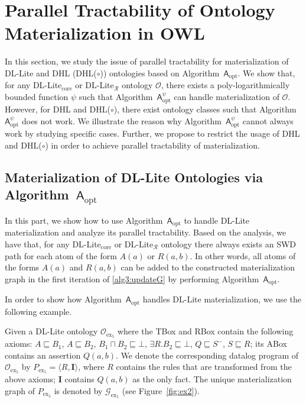 \section{Parallel Tractability of Ontology Materialization in OWL}
\label{sec:ptonto}

In this section, we study the issue of parallel tractability
for materialization of DL-Lite and DHL (DHL($\circ$)) ontologies
based on Algorithm~$\mathsf{A}_{\text{opt}}$. We show that, for any DL-Lite$_{\text{core}}$ or DL-Lite$_\mathcal{R}$ ontology $\mathcal{O}$,
there exists a poly-logarithmically bounded function $\psi$
such that Algorithm~$\mathsf{A}_{\text{opt}}^{\psi}$ can handle materialization of $\mathcal{O}$.
However, for DHL and DHL($\circ$), there exist ontology classes such that Algorithm~$\mathsf{A}_{\text{opt}}^\psi$
does not work. We illustrate the reason why Algorithm~$\mathsf{A}_{\text{opt}}^\psi$ cannot always
work by studying specific cases.
Further, we propose to restrict the usage of DHL and DHL($\circ$) in order to achieve parallel tractability
of materialization.

\subsection{Materialization of DL-Lite Ontologies via Algorithm~$\mathsf{A}_{\text{opt}}$}

In this part, we show how to use Algorithm~$\mathsf{A}_{\text{opt}}$ to handle
DL-Lite materialization and analyze its parallel tractability.
Based on the analysis, we have that, for any DL-Lite$_{\text{core}}$ or DL-Lite$_\mathcal{R}$ ontology
there always exists an SWD path for each atom of the form $A(a)$ or $R(a,b)$.
In other words, all atoms of the forms $A(a)$ and $R(a,b)$ can be added to
the constructed materialization graph in the first iteration of \ref{alg3:updateG}
by performing Algorithm~$\mathsf{A}_{\text{opt}}$.

In order to show how Algorithm~$\mathsf{A}_{\text{opt}}$ handles DL-Lite materialization,
we use the following example.

\begin{example}\label{exp:dllite}
Given a DL-Lite ontology $\mathcal{O}_{\text{ex}_5}$
where the TBox and RBox contain the following axioms:
$A\sqsubseteq B_1$, $A\sqsubseteq B_2$, $B_1\sqcap B_2\sqsubseteq\bot$,
$\exists R.B_2\sqsubseteq\bot$, $Q\sqsubseteq S^-$, $S\sqsubseteq R$;
its ABox contains an assertion $Q(a,b)$.
We denote the corresponding datalog program of $\mathcal{O}_{\text{ex}_5}$ by $P_{\text{ex}_5}=\langle R, \textbf{I}\rangle$,
where $R$ contains the rules that are transformed from the above axioms; $\textbf{I}$ contains $Q(a,b)$
as the only fact.
The unique materialization graph of $P_{\text{ex}_5}$ is denoted by $\mathcal{G}_{\text{ex}_5}$ (see Figure~\ref{fig:ex2}).
\end{example}

